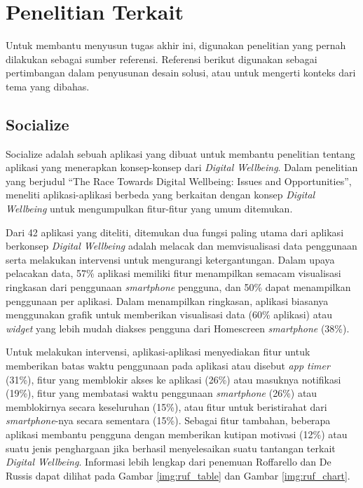 

\section{Penelitian Terkait}
\label{sec:penelitian_terkait}

Untuk membantu menyusun tugas akhir ini, digunakan penelitian yang pernah dilakukan sebagai sumber referensi. Referensi berikut digunakan sebagai pertimbangan dalam penyusunan desain solusi, atau untuk mengerti konteks dari tema yang dibahas.

\subsection{Socialize}

Socialize adalah sebuah aplikasi yang dibuat untuk membantu penelitian tentang aplikasi yang menerapkan konsep-konsep dari \textit{Digital Wellbeing}. Dalam penelitian yang berjudul “The Race Towards Digital Wellbeing: Issues and Opportunities”, \textcite{CHI2019SOCIALIZE} meneliti aplikasi-aplikasi berbeda yang berkaitan dengan konsep \textit{Digital Wellbeing} untuk mengumpulkan fitur-fitur yang umum ditemukan.

Dari 42 aplikasi yang diteliti, ditemukan dua fungsi paling utama dari aplikasi berkonsep \textit{Digital Wellbeing} adalah melacak dan memvisualisasi data penggunaan serta melakukan intervensi untuk mengurangi ketergantungan. Dalam upaya pelacakan data, 57\% aplikasi memiliki fitur menampilkan semacam visualisasi ringkasan dari penggunaan \textit{smartphone} pengguna, dan 50\% dapat menampilkan penggunaan per aplikasi. Dalam menampilkan ringkasan, aplikasi biasanya menggunakan grafik untuk memberikan visualisasi data (60\% aplikasi) atau \textit{widget} yang lebih mudah diakses pengguna dari Homescreen \textit{smartphone} (38\%).

Untuk melakukan intervensi, aplikasi-aplikasi menyediakan fitur untuk memberikan batas waktu penggunaan pada aplikasi atau disebut \textit{app timer} (31\%), fitur yang memblokir akses ke aplikasi (26\%) atau masuknya notifikasi (19\%), fitur yang membatasi waktu penggunaan \textit{smartphone} (26\%) atau memblokirnya secara keseluruhan (15\%), atau fitur untuk beristirahat dari \textit{smartphone}-nya secara sementara (15\%). Sebagai fitur tambahan, beberapa aplikasi membantu pengguna dengan memberikan kutipan motivasi (12\%) atau suatu jenis penghargaan jika berhasil menyelesaikan suatu tantangan terkait \textit{Digital Wellbeing}. Informasi lebih lengkap dari penemuan Roffarello dan De Russis dapat dilihat pada Gambar \ref{img:ruf_table} dan Gambar \ref{img:ruf_chart}.

